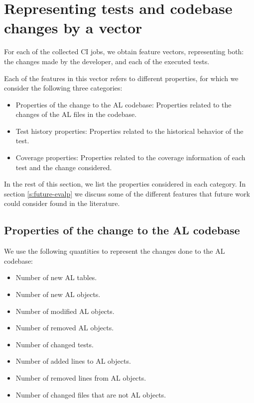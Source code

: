 \section{Representing tests and codebase changes by a vector}\label{s:method-characterizing-testruns}

For each of the collected CI jobs, we obtain feature vectors, representing
both: the changes made by the developer, and each of the executed tests.

Each of the features in this vector refers to different properties, for which
we consider the following three categories:

\begin{itemize}
    \item Properties of the change to the AL codebase: Properties related to the changes of the AL files in the codebase.
    \item Test history properties: Properties related to the historical behavior of the test.
    \item Coverage properties: Properties related to the coverage information of each test and the change considered.
\end{itemize}

In the rest of this section, we list the properties considered in each category.
In section \ref{s:future-evalp} we discuss some of the different features that 
future work could consider found in the literature.

\subsection{Properties of the change to the AL codebase}

We use the following quantities to represent the changes done to the
AL codebase:

\begin{itemize}
    \item Number of new AL tables.
    \item Number of new AL objects.
    \item Number of modified AL objects.
    \item Number of removed AL objects.
    \item Number of changed tests.
    \item Number of added lines to AL objects.
    \item Number of removed lines from AL objects.
    \item Number of changed files that are not AL objects.
\end{itemize}

